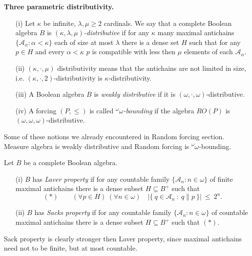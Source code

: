 \begin{definition}{\bf Three parametric distributivity.}
\begin{itemize}
 \item[(i)] Let $\kappa$ be infinite, $\lambda,\mu \geq 2$ cardinals.
	We say that a complete Boolean algebra $B$ is
	\emph{$(\kappa,\lambda,\mu)$-distributive} if for any $\kappa$ many
	maximal antichains $\{\mathcal A_\alpha : \alpha < \kappa \}$ each
	of size at most $\lambda$ there is a dense set $H$ such that for any
	$p \in H$ and every $\alpha < \kappa$ $p$ is compatible with less then
	$\mu$ elements of each $\mathcal A_\alpha$.
 \item[(ii)] $(\kappa,\cdot,\mu)$ distributivity means that the antichains
	are not limited in size, i.e. $(\kappa,\cdot,2)$-distributivity is
	$\kappa$-distributivity.
 \item[(iii)] A Boolean algebra $B$ is \emph{weakly distributive} if it is
	$(\omega,\cdot,\omega)$-distributive.
 \item[(iv)] A forcing $(P,\leq)$ is called \emph{${}^\omega \omega$-bounding}
	if the algebra $RO(P)$ is $(\omega,\omega,\omega)$-distributive.
\end{itemize}
\end{definition}

Some of these notions we already encountered in Random forcing section. Measure
algebra is weakly distributive and Random forcing is ${}^\omega \omega$-bounding.

\begin{definition}
 Let $B$ be a complete Boolean algebra.
\begin{itemize}
 \item[(i)] $B$ has \emph{Laver property} if for any countable family
	$\{\mathcal A_n : n \in \omega \}$ of finite maximal antichains there is a dense
	subset $H \subseteq B^+$ such that
	$$
	(*) \qquad (\forall p \in H) \ (\forall n \in \omega) \quad
	|\{\ q \in \mathcal A_n \  : \ q \parallel  p \ \}| \ \leq \ 2^n.
	$$
  \item[(ii)] $B$ has \emph{Sacks property} if for any countable family
	$\{\mathcal A_n : n \in \omega \}$ of countable maximal antichains there is a dense
	subset $H \subseteq B^+$ such that $(*)$.

\end{itemize}
\end{definition}

Sack property is clearly stronger then Laver property, since maximal antichains need not
to be finite, but at most countable.

